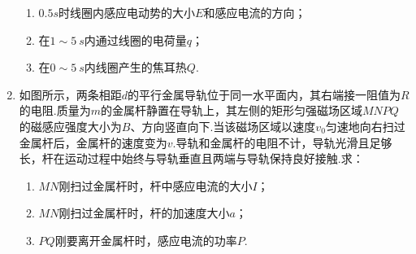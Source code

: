 \begin{enumerate}
\begin{enumerate}
\item 
$ 0. 5 s $时线圈内感应电动势的大小$ E $和感应电流的方向；$ $

\item 
在$ 1\sim 5 \ s $内通过线圈的电荷量$ q $；

\item 
在$ 0 \sim 5 \ s $内线圈产生的焦耳热$ Q. $

\end{enumerate}
\begin{figure}[h!]
\flushright 

\end{figure}


\item 
{}
如图所示，两条相距$ d $的平行金属导轨位于同一水平面内，其右端接一阻值为$ R $的电阻.质量为$ m $的金属杆静置在导轨上，其左侧的矩形匀强磁场区域$ MNPQ $的磁感应强度大小为$ B $、方向竖直向下.当该磁场区域以速度$ v_{0} $匀速地向右扫过金属杆后，金属杆的速度变为$ v. $导轨和金属杆的电阻不计，导轨光滑且足够长，杆在运动过程中始终与导轨垂直且两端与导轨保持良好接触.求：
\begin{enumerate}
\renewcommand{\labelenumi}{\arabic{enumi}.}
\item
$ MN $刚扫过金属杆时，杆中感应电流的大小$ I $；
\item 
$ MN $刚扫过金属杆时，杆的加速度大小$ a $；
\item 
$ PQ $刚要离开金属杆时，感应电流的功率$ P $.

\end{enumerate}
\begin{figure}[h!]
\flushright

\end{figure}


\end{enumerate}

